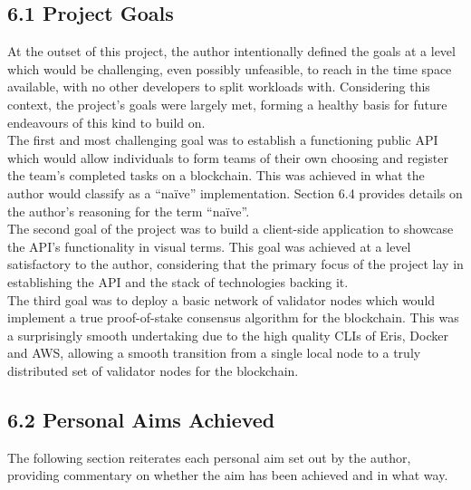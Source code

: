 \documentclass[12pt]{report}
\begin{document}
\subsection{6.1 Project Goals}\label{project-goals-1}

At the outset of this project, the author intentionally defined the
goals at a level which would be challenging, even possibly unfeasible,
to reach in the time space available, with no other developers to split
workloads with. Considering this context, the project's goals were
largely met, forming a healthy basis for future endeavours of this kind
to build on.\\
The first and most challenging goal was to establish a functioning
public API which would allow individuals to form teams of their own
choosing and register the team's completed tasks on a blockchain. This
was achieved in what the author would classify as a ``naïve''
implementation. Section 6.4 provides details on the author's reasoning
for the term ``naïve''.\\
The second goal of the project was to build a client-side application to
showcase the API's functionality in visual terms. This goal was achieved
at a level satisfactory to the author, considering that the primary
focus of the project lay in establishing the API and the stack of
technologies backing it.\\
The third goal was to deploy a basic network of validator nodes which
would implement a true proof-of-stake consensus algorithm for the
blockchain. This was a surprisingly smooth undertaking due to the high
quality CLIs of Eris, Docker and AWS, allowing a smooth transition from
a single local node to a truly distributed set of validator nodes for
the blockchain.

\subsection{6.2 Personal Aims Achieved}\label{personal-aims-achieved}

The following section reiterates each personal aim set out by the
author, providing commentary on whether the aim has been achieved and in
what way.
\end{document}
